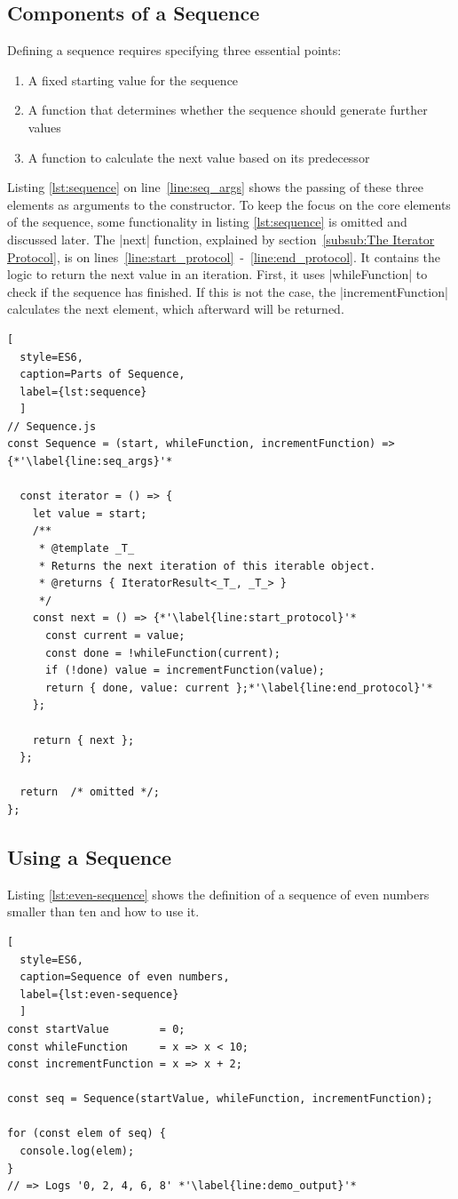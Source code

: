 \subsection{Components of a Sequence}
\label{sub:Components of a Sequence}
Defining a sequence requires specifying three essential points:
\begin{enumerate}
  \item{A fixed starting value for the sequence} 
  \item{A function that determines whether the sequence should generate
    further values} 
  \item{A function to calculate the next value based on its predecessor} 
\end{enumerate}
Listing \ref{lst:sequence} on line~\ref{line:seq_args} shows the passing of
these three elements as arguments to the constructor. To keep the focus on the
core elements of the sequence, some functionality in listing \ref{lst:sequence}
is omitted and discussed later. The |next| function, explained by
section~\ref{subsub:The Iterator Protocol}, is on
lines~\ref{line:start_protocol}~-~\ref{line:end_protocol}. It contains the
logic to return the next value in an iteration. First, it uses |whileFunction|
to check if the sequence has finished. If this is not the case, the
|incrementFunction| calculates the next element, which afterward will be
returned.

\begin{lstlisting}[
  style=ES6, 
  caption=Parts of Sequence,
  label={lst:sequence}
  ]
// Sequence.js
const Sequence = (start, whileFunction, incrementFunction) => {*'\label{line:seq_args}'*

  const iterator = () => {
    let value = start;
    /**
     * @template _T_
     * Returns the next iteration of this iterable object.
     * @returns { IteratorResult<_T_, _T_> }
     */
    const next = () => {*'\label{line:start_protocol}'*
      const current = value;
      const done = !whileFunction(current);
      if (!done) value = incrementFunction(value);
      return { done, value: current };*'\label{line:end_protocol}'*
    };

    return { next };
  };

  return  /* omitted */;
};
\end{lstlisting}

\subsection{Using a Sequence}
\label{sub:Using a Sequence}
Listing \ref{lst:even-sequence} shows the definition of a sequence of even 
numbers smaller than ten and how to use it. 
\begin{lstlisting}[
  style=ES6, 
  caption=Sequence of even numbers,
  label={lst:even-sequence}
  ]
const startValue        = 0;
const whileFunction     = x => x < 10;
const incrementFunction = x => x + 2;

const seq = Sequence(startValue, whileFunction, incrementFunction);

for (const elem of seq) {
  console.log(elem);
}
// => Logs '0, 2, 4, 6, 8' *'\label{line:demo_output}'*
\end{lstlisting}

